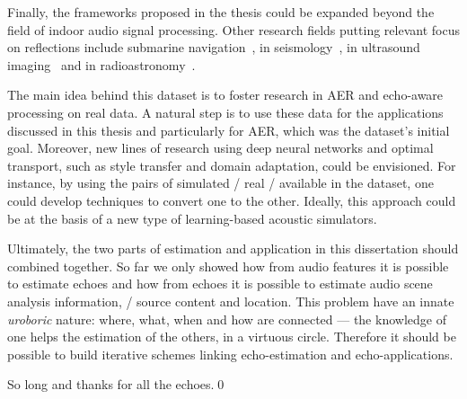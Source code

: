 \mynewline
Finally, the frameworks proposed in the thesis could be expanded beyond the field of indoor audio signal processing.
Other research fields putting relevant focus on reflections include submarine navigation~, in seismology~, in ultrasound imaging~ and in radioastronomy~.


The main idea behind this dataset is to foster research in \ac{AER} and echo-aware processing on real data.
A natural step is to use these data for the applications discussed in this thesis and particularly for \ac{AER}, which was the dataset's initial goal.
Moreover, new lines of research using deep neural networks and optimal transport, such as style transfer and domain adaptation, could be envisioned.
For instance, by using the pairs of simulated \vs/ real \RIRs/ available in the dataset, one could develop techniques to convert one to the other.
Ideally, this approach could be at the basis of a new type of learning-based acoustic simulators.


Ultimately, the two parts of estimation and application in this dissertation should combined together.
So far we only showed how from audio features it is possible to estimate echoes and how from echoes it is possible to estimate audio scene analysis information, \eg/ source content and location.
This problem have an innate \textit{uroboric} nature: where, what, when and how are connected --- the knowledge of one helps the estimation of the others, in a virtuous circle.
Therefore it should be possible to build iterative schemes linking echo-estimation and echo-applications.

\mynewline
So long and thanks for all the echoes.\qed
